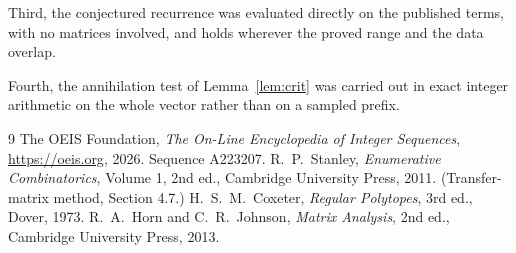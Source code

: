 \documentclass[11pt,a4paper]{article}
\theoremstyle{plain}
\theoremstyle{definition}
\begin{document}
Third, the conjectured recurrence was evaluated directly on the published terms, with no
matrices involved, and holds wherever the proved range and the data overlap.

Fourth, the annihilation test of Lemma~\ref{lem:crit} was carried out in exact integer
arithmetic on the whole vector rather than on a sampled prefix.

\begin{thebibliography}{9}
 The OEIS Foundation, \emph{The On-Line Encyclopedia of Integer
Sequences}, \url{https://oeis.org}, 2026. Sequence A223207.
 R.~P.~Stanley, \emph{Enumerative Combinatorics}, Volume 1, 2nd ed.,
Cambridge University Press, 2011. (Transfer-matrix method, Section 4.7.)
 H.~S.~M.~Coxeter, \emph{Regular Polytopes}, 3rd ed., Dover, 1973.
 R.~A.~Horn and C.~R.~Johnson, \emph{Matrix Analysis}, 2nd ed., Cambridge
University Press, 2013.
\end{thebibliography}
\end{document}
